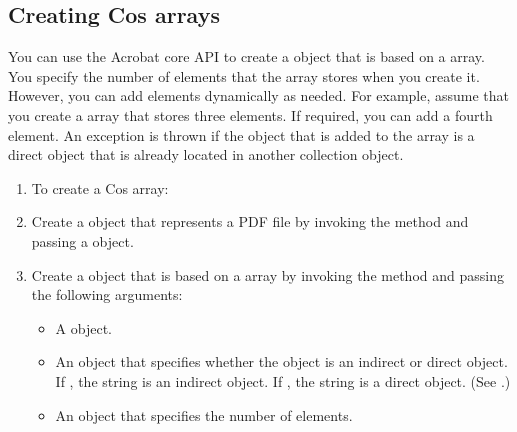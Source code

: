 \documentclass[letterpaper,12pt,english,openany,oneside]{sphinxmanual}
\begin{document}
\subsection{Creating Cos arrays}
\label{\detokenize{Plugins_Cos:creating-cos-arrays}}
You can use the Acrobat core API to create a  object that is based on a  array. You specify the number of elements that the  array stores when you create it. However, you can add elements dynamically as needed. For example, assume that you create a  array that stores three elements. If required, you can add a fourth element. An exception is thrown if the  object that is added to the  array is a direct object that is already located in another  collection object.
\begin{enumerate}
%
\item {} 
To create a Cos array:

\item {} 
Create a  object that represents a PDF file by invoking the  method and passing a  object.

\item {} 
Create a  object that is based on a  array by invoking the  method and passing the following arguments:
\begin{itemize}
\item {} 
A  object.

\item {} 
An  object that specifies whether the  object is an indirect or direct object. If , the string is an indirect object. If , the string is a direct object. (See .)

\item {} 
An  object that specifies the number of elements.

\end{itemize}

\end{enumerate}
\end{document}
